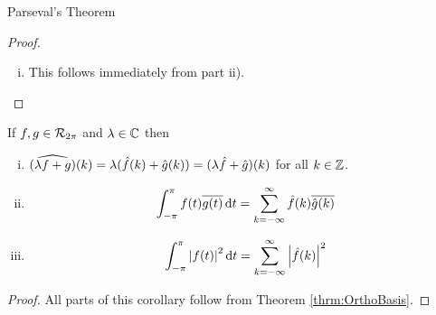 \begin{section}{Parseval's Theorem}
\begin{proof}
\begin{enumerate}[i)]
		\item
			This follows immediately from part ii).
	
	\end{enumerate}
\end{proof}

\begin{cor}\label{cor:OrthoBasis}
	If $f,g \in \riemmint$ and $\iscmplx[\lambda]$ then
		\begin{enumerate}[i)]
			\item
				$\F[(\lambda f + g)](k) = \lambda (\f(k)+\f[g](k))
				= (\lambda \f + \f[g])(k)$ for all $\isintgr[k]$.
			\item
				\begin{displaymath}
					\myintb[\pi]{f(t)\conj{g(t)}}{t}
						= \sum_{k=-\infty}^\infty \f(k)\conj{\f[g](k)}
				\end{displaymath}
			\item
				\begin{displaymath}
					\myintb[\pi]{\modulus{f(t)}^2}{t}
						= \sum_{k=-\infty}^\infty \modulus{\f(k)}^2
				\end{displaymath}
		\end{enumerate}
\end{cor}

\begin{proof}
	All parts of this corollary follow from Theorem \ref{thrm:OrthoBasis}.
\end{proof}

\end{section}